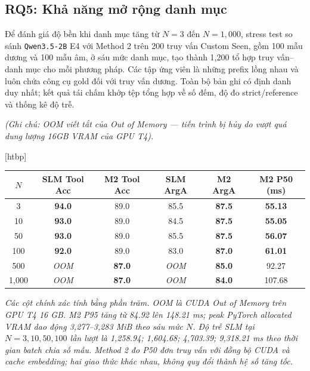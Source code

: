 \documentclass[10pt,twocolumn,a4paper]{article}
\makeatletter
\renewenvironment{table}{\@dblfloat{table}}{\end@dblfloat}
\newcommand{\tabletext}{\small}
\makeatother
\begin{document}
\subsection{RQ5: Khả năng mở rộng danh mục}

Để đánh giá độ bền khi danh mục tăng từ $N=3$ đến $N=1{,}000$, stress test so sánh \texttt{Qwen3.5-2B} E4 với Method 2 trên 200 truy vấn Custom Seen, gồm 100 mẫu dương và 100 mẫu âm, ở sáu mức danh mục, tạo thành 1,200 tổ hợp truy vấn--danh mục cho mỗi phương pháp. Các tập ứng viên là những prefix lồng nhau và luôn chứa công cụ gold đối với truy vấn dương. Toàn bộ bản ghi có định danh duy nhất; kết quả tái chấm khớp tệp tổng hợp về số đếm, độ đo strict/reference và thống kê độ trễ.

\textit{(Ghi chú: OOM viết tắt của Out of Memory — tiến trình bị hủy do vượt quá dung lượng 16GB VRAM của GPU T4).}

\begin{table}[htbp]
    \centering
    \caption{Kết quả stress test của Method 1 và Method 2 ($N = 3 \to 1{,}000$ công cụ)}
    \label{tab:stress-test}
    \tabletext
    \begin{tabular*}{\textwidth}{@{\extracolsep{\fill}}cccccc@{}}
        \toprule
        \textbf{$N$} & \textbf{SLM Tool Acc} & \textbf{M2 Tool Acc} & \textbf{SLM ArgA} & \textbf{M2 ArgA} & \textbf{M2 P50 (ms)} \\
        \midrule
        3 & \textbf{94.0} & 89.0 & 85.5 & \textbf{87.5} & \textbf{55.13} \\
        10 & \textbf{93.0} & 89.0 & 84.5 & \textbf{87.5} & \textbf{55.05} \\
        50 & \textbf{93.0} & 89.0 & 85.5 & \textbf{87.5} & \textbf{56.07} \\
        100 & \textbf{92.0} & 89.0 & 83.0 & \textbf{87.0} & \textbf{61.01} \\
        500 & \textit{OOM} & \textbf{87.0} & \textit{OOM} & \textbf{85.0} & 92.27 \\
        1,000 & \textit{OOM} & \textbf{87.0} & \textit{OOM} & \textbf{84.0} & 107.68 \\
        \bottomrule
    \end{tabular*}
\end{table}

\textit{Các cột chính xác tính bằng phần trăm. OOM là CUDA Out of Memory trên GPU T4 16 GB. M2 P95 tăng từ 84.92 lên 148.21 ms; peak PyTorch allocated VRAM dao động 3,277--3,283 MiB theo sáu mức $N$. Độ trễ SLM tại $N=3,10,50,100$ lần lượt là 1,258.94; 1,604.68; 4,703.39; 9,318.21 ms theo thời gian batch chia số mẫu. Method 2 đo P50 đơn truy vấn với đồng bộ CUDA và cache embedding; hai giao thức khác nhau, không quy đổi thành hệ số tăng tốc.}
\end{document}

